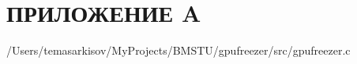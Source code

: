 \chapter*{ПРИЛОЖЕНИЕ A}

\begin{lstinputlisting}[
	caption={Исходный код программы},
	label={lst:source},
	style={c},
	]{/Users/temasarkisov/MyProjects/BMSTU/gpufreezer/src/gpufreezer.c}
\end{lstinputlisting}

\pagebreak